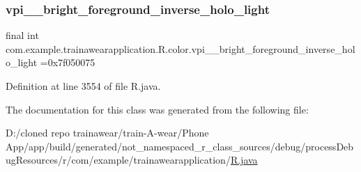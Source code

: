 \subsubsection{\texorpdfstring{vpi\_\_bright\_foreground\_inverse\_holo\_light}{vpi\_\_bright\_foreground\_inverse\_holo\_light}}
{\footnotesize\ttfamily final int com.\+example.\+trainawearapplication.\+R.\+color.\+vpi\+\_\+\+\_\+bright\+\_\+foreground\+\_\+inverse\+\_\+holo\+\_\+light =0x7f050075\hspace{0.3cm}{\ttfamily [static]}}



Definition at line 3554 of file R.\+java.



The documentation for this class was generated from the following file\+:\begin{DoxyCompactItemize}
\item 
D\+:/cloned repo trainawear/train-\/\+A-\/wear/\+Phone App/app/build/generated/not\+\_\+namespaced\+\_\+r\+\_\+class\+\_\+sources/debug/process\+Debug\+Resources/r/com/example/trainawearapplication/\mbox{\hyperlink{process_debug_resources_2r_2com_2example_2trainawearapplication_2_r_8java}{R.\+java}}\end{DoxyCompactItemize}
